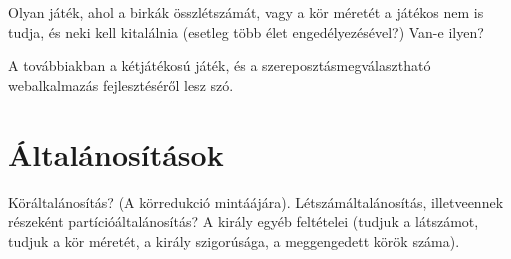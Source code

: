 \documentclass{article}
\begin{document}
	Olyan játék, ahol a birkák összlétszámát, vagy a kör méretét a játékos nem is tudja, és neki kell kitalálnia (esetleg több élet engedélyezésével?) Van-e ilyen?

	A továbbiakban a kétjátékosú játék, és a szereposztásmegválasztható webalkalmazás fejlesztéséről lesz szó.

	\section{Általánosítások}

	Köráltalánosítás? (A körredukció mintáájára). Létszámáltalánosítás, illetveennek részeként partícióáltalánosítás? A király egyéb feltételei (tudjuk a látszámot, tudjuk a kör méretét, a király szigorúsága, a meggengedett körök száma).
\end{document}
